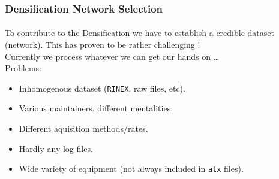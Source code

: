 \documentclass{beamer}
\begin{document}
\begin{frame}\frametitle{Densification Network Selection}\framesubtitle{}
  To contribute to the Densification we have to establish a credible dataset
  (network). This has proven to be rather challenging !\\
  \bigskip
  Currently we process whatever we can get our hands on \ldots\\
  Problems:
  \begin{itemize}
    \item Inhomogenous dataset (\texttt{RINEX}, raw files, etc).
    \item Various maintainers, different mentalities.
    \item Different aquisition methods/rates.
    \item Hardly any log files.
    \item Wide variety of equipment (not always included in \texttt{atx} files).
  \end{itemize}
\end{frame}
\end{document}
